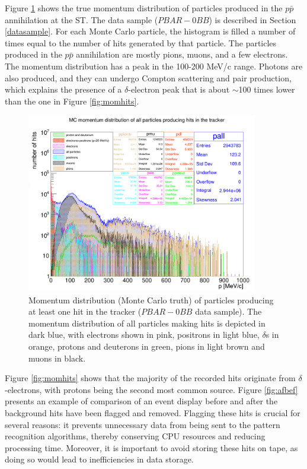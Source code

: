 Figure \ref{fig:pbar} shows the true 
momentum distribution of 
particles produced in the $p\bar{p}$ 
annihilation at the ST. 
The data sample ($PBAR-0BB$) is described in Section \ref{datasample}.
For each Monte Carlo particle, the histogram 
is filled a number of times equal to the number 
of hits generated by that particle. 
The particles produced in the $p\bar{p}$ annihilation 
are mostly pions, muons, and a few electrons. 
The momentum distribution has a 
peak in the 100-200 MeV/c range. Photons are also 
produced, and they can undergo Compton scattering and 
pair production, which explains the presence of a 
$\delta$-electron peak that is about $\sim$100 
times lower than the one in Figure \ref{fig:momhits}.

\begin{figure}[!h]
    \centering
    \includegraphics[width =0.9\textwidth]{figures/png/Screenshot_20240815_124710.png}
\caption[Monte Carlo momentum distribution 
of particles producing hits in the Mu2e 
tracker ($PBAR-0BB$ data sample).]{
    Momentum distribution (Monte Carlo truth) 
    of particles producing at 
   least one hit in the tracker 
   ($PBAR-0BB$ data sample). 
   The momentum distribution 
   of all particles making hits is 
   depicted in dark blue, with electrons 
   shown in pink, positrons in light 
   blue, $\delta$s in orange, protons 
   and deuterons in green, pions in 
   light brown and muons 
   in black. }
   \label{fig:pbar}
\end{figure}
Figure \ref{fig:momhits} shows that 
the majority of the recorded hits 
originate from $\delta$-electrons, 
with protons being the second most 
common source. Figure \ref{fig:afbef} 
presents an example of comparison of an 
event display before and after the background 
hits have been flagged and removed.  
Flagging these hits is crucial for 
several reasons: it prevents unnecessary 
data from being sent to the pattern 
recognition algorithms, thereby conserving 
CPU resources and reducing processing 
time. Moreover, it is important to avoid 
storing these hits on tape, as doing so 
would lead to inefficiencies in data storage.

